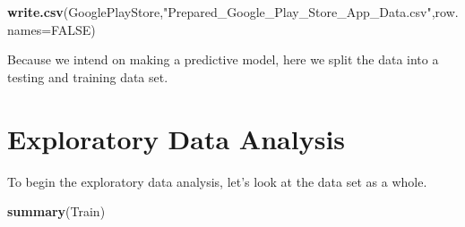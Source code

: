 \documentclass[]{article}
\newenvironment{Shaded}{\begin{snugshade}}{\end{snugshade}}
\newcommand{\KeywordTok}[1]{\textcolor[rgb]{0.13,0.29,0.53}{\textbf{{#1}}}}
\newcommand{\DataTypeTok}[1]{\textcolor[rgb]{0.13,0.29,0.53}{{#1}}}
\newcommand{\DecValTok}[1]{\textcolor[rgb]{0.00,0.00,0.81}{{#1}}}
\newcommand{\FloatTok}[1]{\textcolor[rgb]{0.00,0.00,0.81}{{#1}}}
\newcommand{\StringTok}[1]{\textcolor[rgb]{0.31,0.60,0.02}{{#1}}}
\newcommand{\OtherTok}[1]{\textcolor[rgb]{0.56,0.35,0.01}{{#1}}}
\newcommand{\NormalTok}[1]{{#1}}
\begin{document}
\begin{Shaded}
\begin{Highlighting}[]
\KeywordTok{write.csv}\NormalTok{(GooglePlayStore,}\StringTok{"Prepared_Google_Play_Store_App_Data.csv"}\NormalTok{,}\DataTypeTok{row.names=}\OtherTok{FALSE}\NormalTok{)}
\end{Highlighting}
\end{Shaded}

Because we intend on making a predictive model, here we split the data
into a testing and training data set.

\begin{Shaded}
\end{Shaded}

\section{Exploratory Data Analysis}\label{exploratory-data-analysis}

To begin the exploratory data analysis, let's look at the data set as a
whole.

\begin{Shaded}
\begin{Highlighting}[]
\KeywordTok{summary}\NormalTok{(Train)}
\end{Highlighting}
\end{Shaded}
\end{document}
